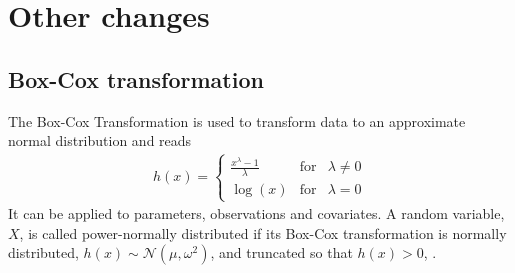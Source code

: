 \chapter{Other changes}
\label{ch:otherChanges}

\section{Box-Cox transformation}
\label{sec:BoxCoxTrafo}
The Box-Cox Transformation \cite{BoxCox:1964} is used to transform data to an approximate normal distribution
and reads
\begin{align}
h(x) = \left\{ \begin{array}{rcl}  \frac{x^{\lambda} -1}{\lambda} & \mbox{for} & \lambda \neq 0 \\  \log(x) & \mbox{for} & \lambda = 0 \end{array}\right. \nonumber
\end{align}
It can be applied to parameters, observations and covariates. 
A random variable, $X$, is called power-normally distributed if its 
Box-Cox transformation is normally distributed, $h(x) \sim \mathcal {N} (\mu,\omega^2)$, 
and truncated so that $h(x) > 0$, \cite{LavielleBook:2014}.

